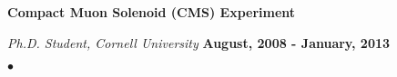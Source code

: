\documentclass[margin,line]{res}
\newenvironment{list2}{
  \begin{list}{$\bullet$}{%
      \setlength{\itemsep}{0in}
      \setlength{\parsep}{0in} \setlength{\parskip}{0in}
      \setlength{\topsep}{0in} \setlength{\partopsep}{0in}
      \setlength{\leftmargin}{0.2in}}}{\end{list}}
\begin{document}
\begin{resume}
{\bf Compact Muon Solenoid (CMS) Experiment}

\vspace{-.3cm}
{\em Ph.D. Student, Cornell University} \hfill {\bf August, 2008 - January, 2013}\\

\vspace*{-5mm}
\vspace*{2mm}
\begin{list2}





\end{list2}
\end{resume}
\end{document}
